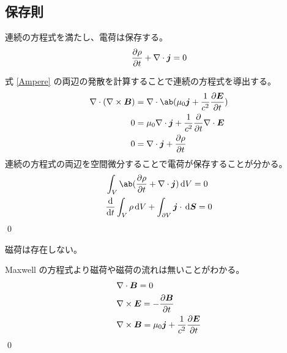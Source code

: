 \documentclass[uplatex,dvipdfmx,a4paper,11pt]{jlreq}
\makeatletter
\newcommand{\EE}{\bm{E}}
\newcommand{\BB}{\bm{B}}
\newcommand{\vnabla}{\mathbf{\nabla}}
\numberwithin{equation}{section}
\theoremstyle{definition}
\renewenvironment{proof}[1][\proofname]{\par
  \normalfont
  \topsep6\p@\@plus6\p@ \trivlist
  \item[\hskip\labelsep{\bfseries #1}\@addpunct{\bfseries}]\ignorespaces\quad\par
}{%
  \qed\endtrivlist\@endpefalse
}
\renewcommand\proofname{証明}
\makeatother
\begin{document}
\subsection{保存則}
\begin{theorem}[電荷の保存則]
  連続の方程式を満たし、電荷は保存する。
  \begin{align}
    \diffp{\rho}{t} + \vnabla\cdot\bm{j} = 0
  \end{align}
\end{theorem}
\begin{proof}
  式 \eqref{Ampere} の両辺の発散を計算することで連続の方程式を導出する。
  \begin{align}
    \vnabla\cdot(\vnabla\times\BB) & = \vnabla\cdot\ab(\mu_0\bm{j} + \frac{1}{c^2}\diffp{\EE}{t})        \\
    0                              & = \mu_0\vnabla\cdot\bm{j} + \frac{1}{c^2}\diffp{}{t}\vnabla\cdot\EE \\
    0                              & = \vnabla\cdot\bm{j} + \diffp{\rho}{t}
  \end{align}
  連続の方程式の両辺を空間微分することで電荷が保存することが分かる。
  \begin{align}
     & \int_V\ab(\diffp{\rho}{t} + \vnabla\cdot\bm{j})\dl{V} = 0                \\
     & \diff{}{t}\int_V\rho\dl{V} + \int_{\partial V}\bm{j}\cdot\dl{\bm{S}} = 0
  \end{align}
\end{proof}

\begin{theorem}[磁荷の存在]
  磁荷は存在しない。
\end{theorem}
\begin{proof}
  Maxwell の方程式より磁荷や磁荷の流れは無いことがわかる。
  \begin{align}
     & \vnabla\cdot\BB = 0                                          \\
     & \vnabla\times\EE = -\diffp{\BB}{t}                           \\
     & \vnabla\times\BB = \mu_0\bm{j} + \frac{1}{c^2}\diffp{\EE}{t}
  \end{align}
\end{proof}
\end{document}
